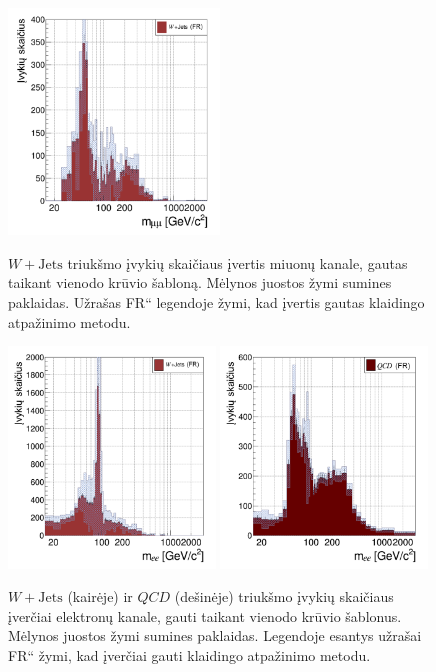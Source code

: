 \documentclass[a4paper, 12pt, oneside]{article}
\newcommand{\WJets}{W\! +\!\mathrm{Jets}}
\newcommand{\ltq}[1]{{\quotedblbase{}#1\textquotedblleft{}}}
\newcommand{\QCD}{QC\! D}
\newlength\q
\begin{document}
\begin{figure}[b!]
	\RawFloats\centering
	\includegraphics[width=0.5\textwidth]{Magistrinis/WJETest_mumu_final.png}
	\caption{\label{fig:JETmumufit}
		$\WJets$ triukšmo įvykių skaičiaus įvertis miuonų kanale, gautas taikant vienodo krūvio šabloną.
		Mėlynos juostos žymi sumines paklaidas.
		Užrašas \ltq{FR} legendoje žymi, kad įvertis gautas klaidingo atpažinimo metodu.
	}
\vspace{2cm}
	\includegraphics[width=0.49\textwidth]{Magistrinis/WJETest_ee_final.png}
	\includegraphics[width=0.49\textwidth]{Magistrinis/QCDest_ee_final.png}
	\caption{\label{fig:JETeefit}
		$\WJets$ (kairėje) ir $\QCD$ (dešinėje) triukšmo įvykių skaičiaus įverčiai elektronų kanale, gauti taikant vienodo krūvio šablonus.
		Mėlynos juostos žymi sumines paklaidas.
		Legendoje esantys užrašai \ltq{FR} žymi, kad įverčiai gauti klaidingo atpažinimo metodu.
	}	
\end{figure}
\end{document}

